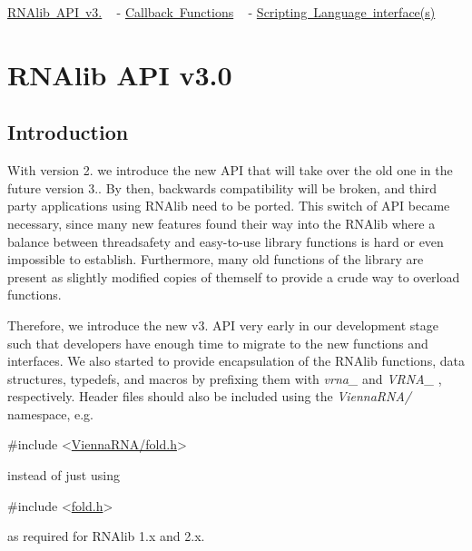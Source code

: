 
\begin{DoxyItemize}
\item \mbox{\hyperlink{newAPI}{R\+N\+Alib A\+PI v3.}} ~\newline
-\/ \mbox{\hyperlink{callbacks}{Callback Functions}} ~\newline
-\/ \mbox{\hyperlink{wrappers}{Scripting Language interface(s)}} 
\end{DoxyItemize}\hypertarget{newAPI}{}\section{R\+N\+Alib A\+PI v3.0}\label{newAPI}
\hypertarget{new_a_p_i_newAPI_intro}{}\subsection{Introduction}\label{new_a_p_i_newAPI_intro}
With version 2. we introduce the new A\+PI that will take over the old one in the future version 3.. By then, backwards compatibility will be broken, and third party applications using R\+N\+Alib need to be ported. This switch of A\+PI became necessary, since many new features found their way into the R\+N\+Alib where a balance between threadsafety and easy-\/to-\/use library functions is hard or even impossible to establish. Furthermore, many old functions of the library are present as slightly modified copies of themself to provide a crude way to overload functions.

Therefore, we introduce the new v3. A\+PI very early in our development stage such that developers have enough time to migrate to the new functions and interfaces. We also started to provide encapsulation of the R\+N\+Alib functions, data structures, typedefs, and macros by prefixing them with {\itshape vrna\+\_\+} and {\itshape V\+R\+N\+A\+\_\+} , respectively. Header files should also be included using the {\itshape Vienna\+R\+N\+A/} namespace, e.\+g. 
\begin{DoxyCode}
\textcolor{preprocessor}{#include <\mbox{\hyperlink{fold_8h}{ViennaRNA/fold.h}}>}
\end{DoxyCode}
 instead of just using 
\begin{DoxyCode}
\textcolor{preprocessor}{#include <\mbox{\hyperlink{fold_8h}{fold.h}}>}
\end{DoxyCode}
 as required for R\+N\+Alib 1.\+x and 2.\+x.

